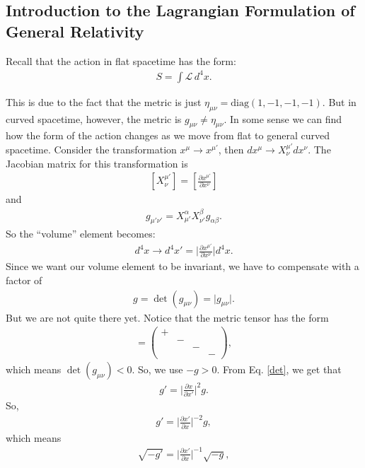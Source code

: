 \documentclass{book}
\numberwithin{equation}{section}
\theoremstyle{definition}
\newcommand{\p}{\partial}
\newcommand{\lag}{\mathcal{L}}
\newcommand{\f}[2]{\frac{#1}{#2}}
\newcommand{\lb}{\left[}
\newcommand{\rb}{\right]}
\begin{document}
\subsection{Introduction to the Lagrangian Formulation of General Relativity}

Recall that the action in flat spacetime has the form:
\begin{align}
S = \int \lag \,d^4x.
\end{align}

This is due to the fact that the metric is just $\eta_{\mu\nu} = \text{diag}(1,-1,-1,-1)$. But in curved spacetime, however, the metric is $g_{\mu\nu} \neq \eta_{\mu\nu}$. In some sense we can find how the form of the action changes as we move from flat to general curved spacetime. Consider the transformation $x^\mu \to x^{\mu'}$, then $dx^\mu \to X^{\mu'}_\nu dx^\nu$. The Jacobian matrix for this transformation is 
\begin{align}
\lb X^{\mu'}_\nu \rb = \lb\f{\p x^{\mu'}}{\p x^\nu}\rb
\end{align} 
and
\begin{align}
g_{\mu'\nu'} = X^\alpha_{\mu'}X^\beta_{\nu'}g_{\alpha\beta}.
\end{align}
So the ``volume'' element becomes:
\begin{align}
d^4x \to  d^4x' = \bigg\vert \f{\p x^{\mu'}}{\p x^\nu}  \bigg\vert d^4x.
\end{align}
Since we want our volume element to be invariant, we have to compensate with a factor of 
\begin{align}\label{det}
g = \det(g_{\mu\nu}) = \vert g_{\mu\nu} \vert.
\end{align}
But we are not quite there yet. Notice that the metric tensor has the form
\begin{align}
[g_{\mu\nu}] = \begin{pmatrix}
+ &&&\\
&-&&\\
&&-&\\
&&&-
\end{pmatrix},
\end{align}
which means $\det(g_{\mu\nu}) < 0$. So, we use $-g > 0$. From Eq. \eqref{det}, we get that 
\begin{align}
g' = \bigg\vert \f{\p x}{\p x'} \bigg\vert^2 g.
\end{align}
So,
\begin{align}
g' = \bigg\vert \f{\p x'}{\p x} \bigg\vert^{-2} g,
\end{align}
which means
\begin{align}
\sqrt{-g'} = \bigg\vert \f{\p x'}{\p x} \bigg\vert^{-1}\sqrt{-g},
\end{align}
\end{document}
